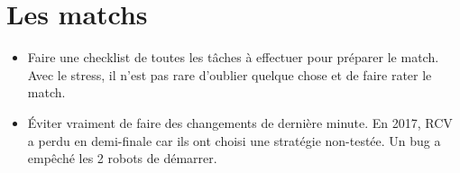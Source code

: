 \documentclass[a4paper, 11pt]{report}
\begin{document}
\section{Les matchs}
\begin{itemize}
\item Faire une checklist de toutes les tâches à effectuer pour préparer le match. Avec le stress, il n’est pas rare d’oublier quelque chose et de faire rater le match.
\item Éviter vraiment de faire des changements de dernière minute. En 2017, RCV a perdu en demi-finale car ils ont choisi une stratégie non-testée. Un bug a empêché les 2 robots de démarrer.
\end{itemize}
\end{document}

